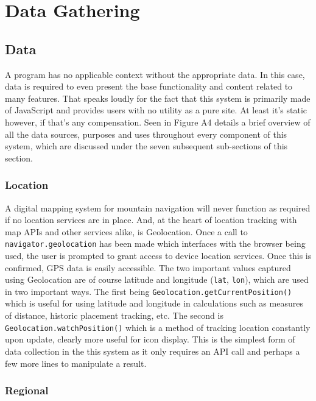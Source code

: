 \documentclass[11pt, english]{article}
\begin{document}
\newpage

\section{Data Gathering}\label{ch4}

	\subsection{Data}

	A program has no applicable context without the appropriate data. In this case, data is required to even present the base functionality and content related to many features. That speaks loudly for the fact that this system is primarily made of JavaScript and provides users with no utility as a pure site. At least it's static however, if that's any compensation. Seen in Figure A4 details a brief overview of all the data sources, purposes and uses throughout every component of this system, which are discussed under the seven subsequent sub-sections of this section.

		\subsubsection{Location}

	A digital mapping system for mountain navigation will never function as required if no location services are in place. And, at the heart of location tracking with map APIs and other services alike, is Geolocation. Once a call to \verb|navigator.geolocation| has been made which interfaces with the browser being used, the user is prompted to grant access to device location services. Once this is confirmed, GPS data is easily accessible. The two important values captured using Geolocation are of course latitude and longitude (\texttt{lat}, \texttt{lon}), which are used in two important ways. The first being \verb|Geolocation.getCurrentPosition()| which is useful for using latitude and longitude in calculations such as measures of distance, historic placement tracking, etc. The second is \verb|Geolocation.watchPosition()| which is a method of tracking location constantly upon update, clearly more useful for icon display. This is the simplest form of data collection in the this system as it only requires an API call and perhaps a few more lines to manipulate a result.

		\subsubsection{Regional}
\end{document}
